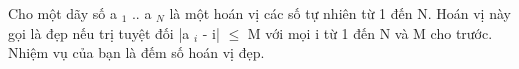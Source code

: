 Cho một dãy số a   $_    1   $   .. a   $_    N   $   là một hoán vị các số tự nhiên từ 1 đến N. Hoán vị này gọi là đẹp nếu trị tuyệt đối |a   $_    i   $   - i|  $\le$  M với mọi i từ 1 đến N và M cho trước. Nhiệm vụ của bạn là đếm số hoán vị đẹp.